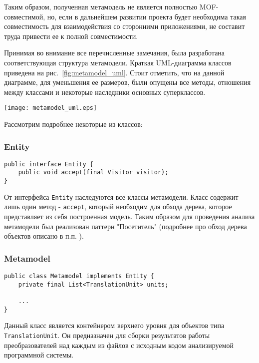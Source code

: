 Таким образом, полученная метамодель не является полностью MOF-совместимой, но,
если в дальнейшем развитии проекта будет необходима такая совместимость для
взаимодействия со сторонними приложениями, не составит труда привести ее к
полной совместимости.

Принимая во внимание все перечисленные замечания, была разработана
соответствующая структура метамодели. Краткая UML-диаграмма классов приведена на
рис.~\ref{fig:metamodel_uml}. Стоит отметить, что на данной диаграмме, для
уменьшения ее размеров, были опущены все методы, отношения между классами и
некоторые наследники основных суперклассов.

\newpage
\begin{sidewaysfigure}[ht!]
    \begin{center}
        \texttt{[image: metamodel\_uml.eps]}
    \end{center}
    \caption{Упрощенная диаграмма классов метамодели}
    \label{fig:metamodel_uml}
\end{sidewaysfigure}

Рассмотрим подробнее некоторые из классов:

\subsubsection{Entity}

\begin{lstlisting}
public interface Entity {
    public void accept(final Visitor visitor);
}
\end{lstlisting}

От интерфейса \texttt{Entity} наследуются все классы метамодели. Класс содержит
лишь один метод - \texttt{accept}, который необходим для обхода дерева, которое
представляет из себя построенная модель. Таким образом для проведения анализа
метамодели был реализован паттерн "Посетитель" (подробнее про обход
дерева объектов описано в п.п. ).

\subsubsection{Metamodel}

\begin{lstlisting}
public class Metamodel implements Entity {
    private final List<TranslationUnit> units;

    ...
}
\end{lstlisting}

Данный класс является контейнером верхнего уровня для объектов типа
\texttt{TranslationUnit}. Он предназначен для сборки результатов работы
преобразователей над каждым из файлов с исходным кодом анализируемой программной
системы.

